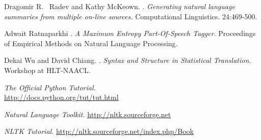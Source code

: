 \documentclass[11pt]{article}
\begin{document}
\begin{thebibliography}{99}
Dragomir R.~ Radev and Kathy McKeown.
.
\newblock \emph{Generating natural language summaries from multiple on-line sources.}
\newblock Computational Linguistics. 24:469-500.

Adwait Ratnaparkhi
.
\newblock \emph{A Maximum Entropy Part-Of-Speech Tagger.}
\newblock Proceedings of Empirical Methods on Natural Language Processing.

Dekai Wu and David Chiang.
.
\newblock \emph{Syntax and Structure in Statistical Translation.}
\newblock Workshop at HLT-NAACL.

\newblock \emph{The Official Python Tutorial.} \\
\newblock \url{http://docs.python.org/tut/tut.html}

\newblock \emph{Natural Language Toolkit.}
\newblock \url{http://nltk.sourceforge.net}

\newblock \emph{NLTK Tutorial.}
\newblock \url{http://nltk.sourceforge.net/index.php/Book}

\end{thebibliography}
\end{document}
